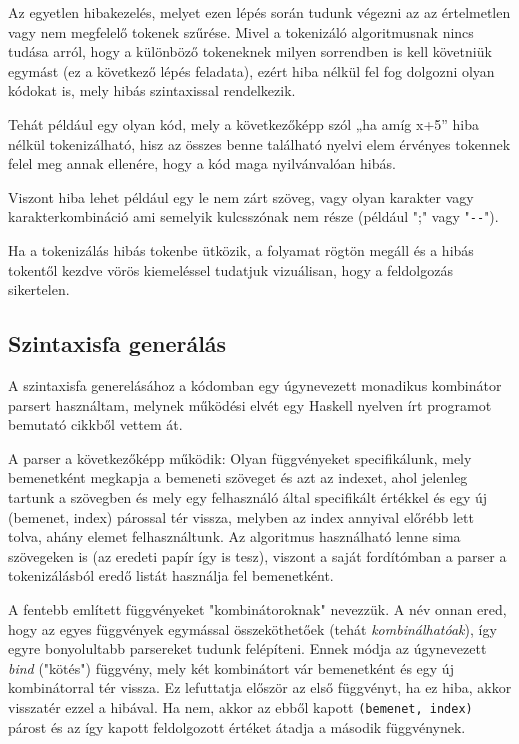 Az egyetlen hibakezelés, melyet ezen lépés során tudunk végezni az az értelmetlen vagy nem megfelelő tokenek szűrése. Mivel a tokenizáló algoritmusnak nincs tudása arról, hogy a különböző tokeneknek milyen sorrendben is kell követniük egymást (ez a következő lépés feladata), ezért hiba nélkül fel fog dolgozni olyan kódokat is, mely hibás szintaxissal rendelkezik.

Tehát például egy olyan kód, mely a következőképp szól „ha amíg x+5” hiba nélkül tokenizálható, hisz az összes benne található nyelvi elem érvényes tokennek felel meg annak ellenére, hogy a kód maga nyilvánvalóan hibás.

Viszont hiba lehet például egy le nem zárt szöveg, vagy olyan karakter vagy karakterkombináció ami semelyik kulcsszónak nem része (például ";" vagy "\verb|--|").

Ha a tokenizálás hibás tokenbe ütközik, a folyamat rögtön megáll és a hibás tokentől kezdve vörös kiemeléssel tudatjuk vizuálisan, hogy a feldolgozás sikertelen.

\subsection{Szintaxisfa generálás}
\label{sec:parser}

A szintaxisfa generelásához a kódomban egy úgynevezett monadikus kombinátor parsert használtam, melynek működési elvét egy Haskell nyelven írt programot bemutató cikkből\cite{monadic} vettem át.

A parser a következőképp működik: Olyan függvényeket specifikálunk, mely bemenetként megkapja a bemeneti szöveget és azt az indexet, ahol jelenleg tartunk a szövegben és mely egy felhasználó által specifikált értékkel és egy új (bemenet, index) párossal tér vissza, melyben az index annyival előrébb lett tolva, ahány elemet felhasználtunk. Az algoritmus használható lenne sima szövegeken is (az eredeti papír így is tesz), viszont a saját fordítómban a parser a tokenizálásból eredő listát használja fel bemenetként.

A fentebb említett függvényeket "kombinátoroknak" nevezzük. A név onnan ered, hogy az egyes függvények egymással összeköthetőek (tehát \textit{kombinálhatóak}), így egyre bonyolultabb parsereket tudunk felépíteni. Ennek módja az úgynevezett \textit{bind} ("kötés") függvény, mely két kombinátort vár bemenetként és egy új kombinátorral tér vissza. Ez lefuttatja először az első függvényt, ha ez hiba, akkor visszatér ezzel a hibával. Ha nem, akkor az ebből kapott \texttt{(bemenet, index)} párost és az így kapott feldolgozott értéket átadja a második függvénynek. 

